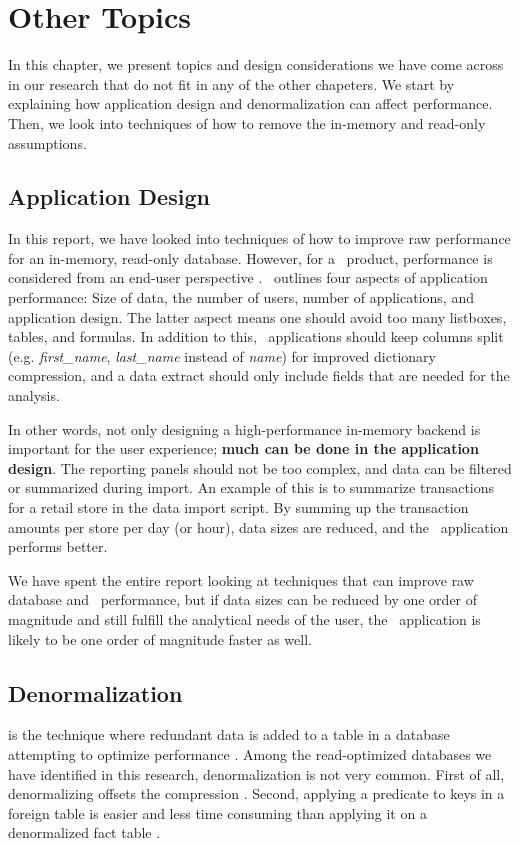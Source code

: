 \chapter{Other Topics}
\label{chap:Other Topics}
In this chapter, we present topics and design considerations we have come across in our research that do not fit in any of the other chapeters. We start by explaining how application design and denormalization can affect performance. Then, we look into techniques of how to remove the in-memory and read-only assumptions.


\newpage

\section{Application Design}
\label{sec:Application Design}
In this report, we have looked into techniques of how to improve raw performance for an in-memory, read-only database. However, for a \bd~product, performance is considered from an end-user perspective \cite{Qlik2011-yc}. \qlikview~outlines four aspects of application performance: Size of data, the number of users, number of applications, and application design. The latter aspect means one should avoid too many listboxes, tables, and formulas. In addition to this, \bd~applications should keep columns split (e.g. \textit{first\_name}, \textit{last\_name} instead of \textit{name}) for improved dictionary compression, and a data extract should only include fields that are needed for the analysis.


In other words, not only designing a high-performance in-memory backend is important for the user experience; \textbf{much can be done in the application design}. The reporting panels should not be too complex, and data can be filtered or summarized during import. An example of this is to summarize transactions for a retail store in the data import script. By summing up the transaction amounts per store per day (or hour), data sizes are reduced, and the \bd~application performs better.

We have spent the entire report looking at techniques that can improve raw database and \bd~performance, but if data sizes can be reduced by one order of magnitude and still fulfill the analytical needs of the user, the \bd~application is likely to be one order of magnitude faster as well.


\section{Denormalization}
\label{sec:Denormalization}
  is the technique where redundant data is added to a table in a database attempting to optimize performance \cite{Raman2008-gi, Wikipedia_contributors2015-az}. Among the read-optimized databases we have identified in this research, denormalization is not very common. First of all, denormalizing offsets the compression \cite{Barber2012-xt}. Second, applying a predicate to keys in a foreign table is easier and less time consuming than applying it on a denormalized fact table \cite{Abadi2008-dd}. 

